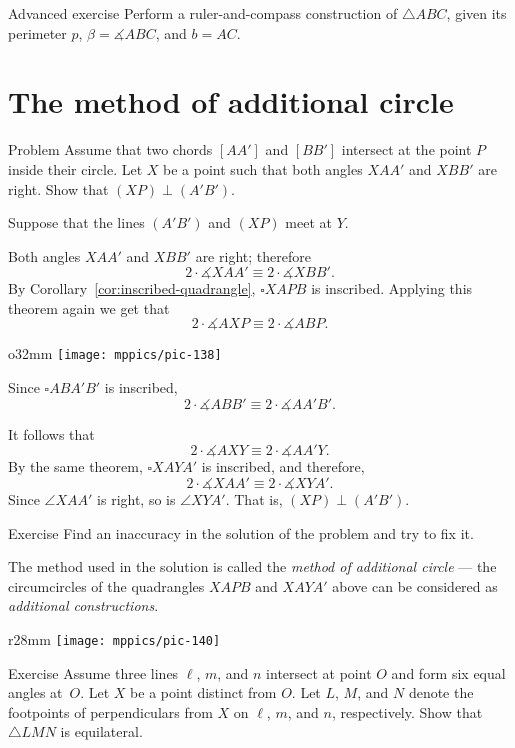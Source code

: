 \begin{thm}{Advanced exercise}\label{ex:perim+angle+side}
Perform a ruler-and-compass construction of $\triangle ABC$, given its perimeter $p$, $\beta=\measuredangle ABC$, and $b=AC$.
\end{thm}

\section{The method of additional circle}

\begin{thm*}{Problem}
 Assume that two chords $[AA']$ and $[BB']$ intersect at the point $P$ inside their circle.
Let $X$ be a point such that both angles $XAA'$ and $XBB'$ are right.
Show that $(XP)\perp(A'B')$.
\end{thm*}

Suppose that the lines $(A'B')$ and $(XP)$ meet at $Y$.

Both angles $XAA'$ and $XBB'$ are right;
therefore
\[2\cdot\measuredangle XAA'
\equiv
2\cdot\measuredangle XBB'.\]
By Corollary~\ref{cor:inscribed-quadrangle},  $\square XAPB$ is inscribed.
Applying this theorem again we get that
\[2\cdot\measuredangle AXP
\equiv
2\cdot\measuredangle ABP.\]

\begin{wrapfigure}[9]{o}{32mm}
\vskip-7mm
\centering
\texttt{[image: mppics/pic-138]}
\end{wrapfigure}

Since $\square ABA'B'$ is inscribed, 
\[2\cdot\measuredangle ABB'
\equiv
2\cdot\measuredangle AA'B'.\]

It follows that 
\[2\cdot\measuredangle AXY
\equiv
2\cdot\measuredangle AA'Y.\]
By the same theorem, $\square XAYA'$ is inscribed,
and
therefore, 
\[2\cdot\measuredangle XAA'
\equiv
2\cdot\measuredangle XYA'.\]
Since $\angle XAA'$ is right, 
so is $\angle XYA'$. 
That is, $(XP)\perp(A'B')$.
\qeds

\begin{thm}{Exercise}\label{ex:inaccuracy}
Find an inaccuracy in the solution of the problem and try to fix it.
\end{thm}

The method used in the solution 
is called the \textit{method of additional circle}
--- the circumcircles of the quadrangles $XAPB$ and $XAYA'$ 
 above can be considered as \textit{additional constructions}. 

{

\begin{wrapfigure}{r}{28mm}
\vskip-0mm
\centering
\texttt{[image: mppics/pic-140]}
\end{wrapfigure}

\begin{thm}{Exercise}\label{ex:equilateral-2}
Assume three lines $\ell$, $m$, and $n$ intersect at point $O$ and form six equal angles at~$O$. 
Let $X$ be a point distinct from $O$.
Let $L$, $M$, and $N$ denote the footpoints of perpendiculars from $X$ on $\ell$, $m$, and $n$, respectively.
Show that $\triangle LMN$ is equilateral.
\end{thm}

}


